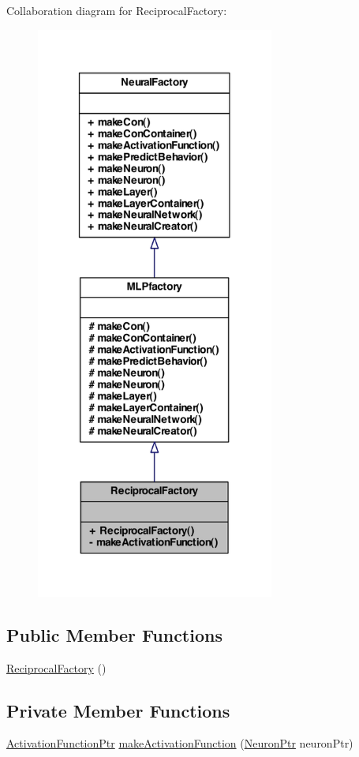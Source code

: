 Collaboration diagram for ReciprocalFactory:\nopagebreak
\begin{figure}[H]
\begin{center}
\leavevmode
\includegraphics[width=222pt]{class_reciprocal_factory__coll__graph}
\end{center}
\end{figure}
\subsection*{Public Member Functions}
\begin{DoxyCompactItemize}
\item 
\hyperlink{class_reciprocal_factory_a28e434cb3f1f3a007f7d91c8a6f21ea9}{ReciprocalFactory} ()
\end{DoxyCompactItemize}
\subsection*{Private Member Functions}
\begin{DoxyCompactItemize}
\item 
\hyperlink{_a_m_o_r_e_8h_a77602a0277a02e5769c3df0adc669b17}{ActivationFunctionPtr} \hyperlink{class_reciprocal_factory_a4258da65a19ff656c79bac5f2699b8d8}{makeActivationFunction} (\hyperlink{_a_m_o_r_e_8h_ac1ea936c2c7728eb382278131652fef4}{NeuronPtr} neuronPtr)
\end{DoxyCompactItemize}


